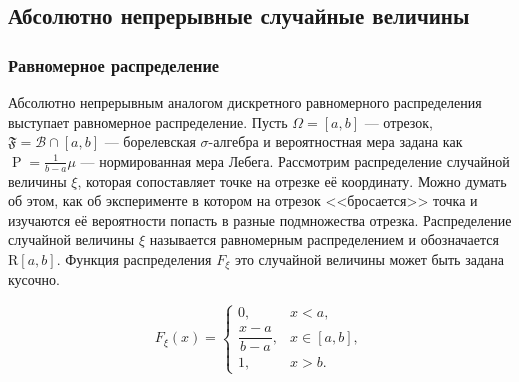 \documentclass[12pt]{article}
\numberwithin{theorem}{section}
\theoremstyle{definition}
\newcommand{\defin}[2]{\hypertarget{#2}{{\color{red} #1}}}
\newcommand{\calB}{\mathcal{B}}
\newcommand{\prob}{\operatorname{P}}
\newcommand{\events}{\mathfrak{F}}
\begin{document}
	\subsection{Абсолютно непрерывные случайные величины}
	
	\subsubsection{Равномерное распределение}
	
	Абсолютно непрерывным аналогом дискретного равномерного распределения выступает равномерное распределение.
	Пусть $ \Omega = [a,b] $ --- отрезок, $ \events = \calB \cap [a,b] $ --- борелевская $ \sigma $-алгебра
	и вероятностная мера задана как $ \prob = \tfrac{1}{b - a}\mu $ --- нормированная мера Лебега.
	Рассмотрим распределение случайной величины $ \xi $, которая сопоставляет точке на отрезке её координату.
	Можно думать об этом, как об эксперименте в котором на отрезок <<бросается>> точка
	и изучаются её вероятности попасть в разные подмножества отрезка.
	Распределение случайной величины $ \xi $ называется \defin{равномерным распределением}{uniform-distribution}
	и обозначается $ \mathrm{R}[a,b] $.
	Функция распределения $ F_\xi $ это случайной величины может быть задана кусочно.
	\begin{center}
		\begin{minipage}{0.45\textwidth}
			\[
			F_\xi(x) =
			\begin{cases}
				0, & x < a, \\
				\dfrac{x - a}{b - a}, & x \in [a, b], \\
				1, & x > b.
			\end{cases}
			\]
		\end{minipage}
		\def\a{1}
		\def\b{4}
		\begin{minipage}{0.5\textwidth}
		\end{minipage}
	\end{center}
\end{document}
